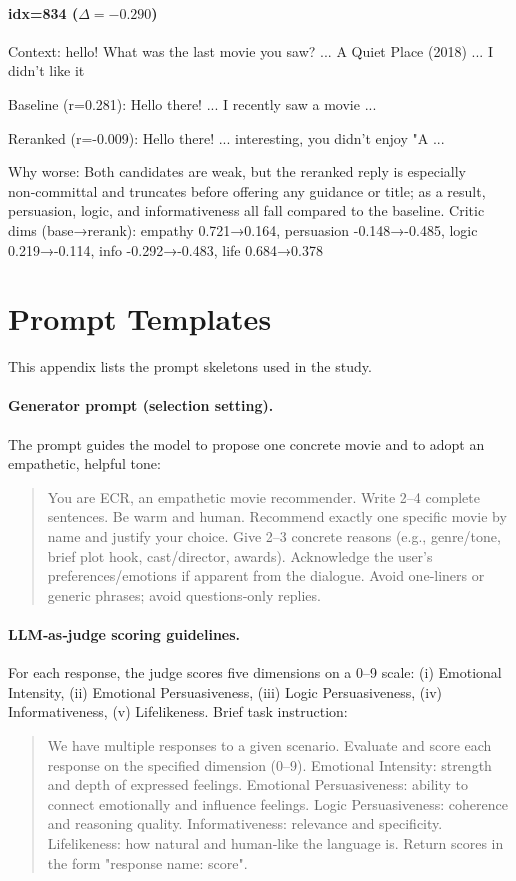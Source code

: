 \documentclass[12pt]{article}
\begin{document}
  \paragraph{idx=834 ($\Delta=-0.290$)}
  \begin{center}
  \begin{qexample}
  Context: hello! What was the last movie you saw? ... A Quiet Place (2018) ... I didn't like it
  
  Baseline (r=0.281): Hello there! ... I recently saw a movie ...

  Reranked (r=-0.009): Hello there! ... interesting, you didn't enjoy "A ...
  \end{qexample}
  \end{center}
  Why worse: Both candidates are weak, but the reranked reply is especially non‑committal and truncates before offering any guidance or title; as a result, persuasion, logic, and informativeness all fall compared to the baseline.
  Critic dims (base→rerank): empathy 0.721→0.164, persuasion -0.148→-0.485, logic 0.219→-0.114, info -0.292→-0.483, life 0.684→0.378
  
  \section{Prompt Templates}
  This appendix lists the prompt skeletons used in the study.
  
  \paragraph{Generator prompt (selection setting).} The prompt guides the model to propose one concrete movie and to adopt an empathetic, helpful tone:
  \begin{quote}
  You are ECR, an empathetic movie recommender. Write 2–4 complete sentences. Be warm and human. Recommend exactly one specific movie by name and justify your choice. Give 2–3 concrete reasons (e.g., genre/tone, brief plot hook, cast/director, awards). Acknowledge the user's preferences/emotions if apparent from the dialogue. Avoid one‑liners or generic phrases; avoid questions‑only replies.
  \end{quote}
  
  \paragraph{LLM‑as‑judge scoring guidelines.} For each response, the judge scores five dimensions on a 0–9 scale: (i) Emotional Intensity, (ii) Emotional Persuasiveness, (iii) Logic Persuasiveness, (iv) Informativeness, (v) Lifelikeness. Brief task instruction:
  \begin{quote}
  We have multiple responses to a given scenario. Evaluate and score each response on the specified dimension (0–9). Emotional Intensity: strength and depth of expressed feelings. Emotional Persuasiveness: ability to connect emotionally and influence feelings. Logic Persuasiveness: coherence and reasoning quality. Informativeness: relevance and specificity. Lifelikeness: how natural and human‑like the language is. Return scores in the form "response name: score".
  \end{quote}
  
\end{document}
